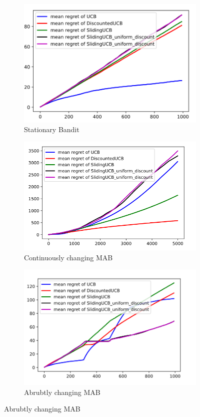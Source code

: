 \begin{figure}[ht]
    \centering
    \begin{subfigure}{.6\textwidth}
      \centering
      \includegraphics[width=.8\linewidth]{img/statio.png}
      \caption{Stationary Bandit}
      \label{fig:statio}
    \end{subfigure}%
    \begin{subfigure}{.6\textwidth}
      \centering
      \includegraphics[width=.8\linewidth]{img/continuous.png}
      \caption{Continuously changing MAB}
      \label{fig:conti}
    \end{subfigure}
    \begin{subfigure}{.6\textwidth}
        \centering
        \includegraphics[width=.8\linewidth]{img/abrupt.png}
        \caption{Abrubtly changing MAB}
        \label{fig:abrupt}
      \end{subfigure}
\end{figure}


